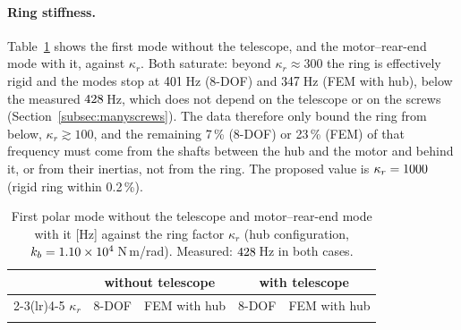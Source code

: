 \documentclass[10pt,a4paper]{article}
\numberwithin{equation}{section}
\begin{document}
\paragraph{Ring stiffness.} Table~\ref{tab:kappa} shows the first mode without the telescope, and the motor--rear-end mode with it, against $\kappa_r$. Both saturate: beyond $\kappa_r \approx 300$ the ring is effectively rigid and the modes stop at $401$\,Hz (8-DOF) and $347$\,Hz (FEM with hub), below the measured $428$\,Hz, which does not depend on the telescope or on the screws (Section~\ref{subsec:manyscrews}). The data therefore only bound the ring from below, $\kappa_r \gtrsim 100$, and the remaining 7\,\% (8-DOF) or 23\,\% (FEM) of that frequency must come from the shafts between the hub and the motor and behind it, or from their inertias, not from the ring. The proposed value is $\kappa_r = 1000$ (rigid ring within 0.2\,\%).
\begin{table}[H]\centering\small
\caption{First polar mode without the telescope and motor--rear-end mode with it [Hz] against the ring factor $\kappa_r$ (hub configuration, $k_b = 1.10\times10^{4}$\,N\,m/rad). Measured: $428$\,Hz in both cases.}\label{tab:kappa}
\begin{tabular}{rrrrr}\toprule
& \multicolumn{2}{c}{without telescope} & \multicolumn{2}{c}{with telescope} \\ \cmidrule(lr){2-3}\cmidrule(lr){4-5}
$\kappa_r$ & 8-DOF & FEM with hub & 8-DOF & FEM with hub \\ \midrule
\\ \bottomrule
\end{tabular}\end{table}
\end{document}
